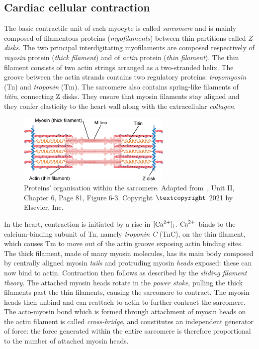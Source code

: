 %
%
%
\subsection{Cardiac cellular contraction}\label{sec:ch1cardiac_cellular_contraction}
The basic contractile unit of each myocyte is called \textit{sarcomere} and is mainly composed of filamentous proteins (\textit{myofilaments}) between thin partitions called \textit{Z disks}. The two principal interdigitating myofilaments are composed respectively of \textit{myosin} protein (\textit{thick filament}) and of \textit{actin} protein (\textit{thin filament}). The thin filament consists of two actin strings arranged as a two-stranded helix. The groove between the actin strands contains two regulatory proteins: \textit{tropomyosin} (\acs{Tn}) and \textit{troponin} (\acs{Tm}). The sarcomere also contains spring-like filaments of \textit{titin}, connecting Z disks. They ensure that myosin filaments stay aligned and they confer elasticity to the heart wall along with the extracellular \textit{collagen}.

\begin{figure}[!ht]
    \myfloatalign
    \includegraphics[width=0.66\textwidth]{figures/chapter01/fig_elsv_5.png}
    \caption{Proteins' organisation within the sarcomere. Adapted from~\cite{Guyton:2021}, Unit II, Chapter 6, Page 81, Figure 6-3. Copyright $\textcopyright$ 2021 by Elsevier, Inc.}
    \label{fig:my_label3}
\end{figure}

\vspace{0.2cm}
In the heart, contraction is initiated by a rise in $[\textrm{Ca}^{2+}]_{i}$. $\textrm{Ca}^{2+}$ binds to the calcium-binding subunit of Tn, namely \textit{troponin C} (\acs{TnC}), on the thin filament, which causes Tm to move out of the actin groove exposing actin binding sites. The thick filament, made of many myosin molecules, has its main body composed by centrally aligned myosin \textit{tails} and protruding myosin \textit{heads} exposed: these can now bind to actin. Contraction then follows as described by the \textit{sliding filament theory}. The attached myosin heads rotate in the \textit{power stoke}, pulling the thick filaments past the thin filaments, causing the sarcomere to contract. The myosin heads then unbind and can reattach to actin to further contract the sarcomere. The acto-myosin bond which is formed through attachment of myosin heads on the actin filament is called \textit{cross-bridge}, and constitutes an independent generator of force: the force generated within the entire sarcomere is therefore proportional to the number of attached myosin heads. 

